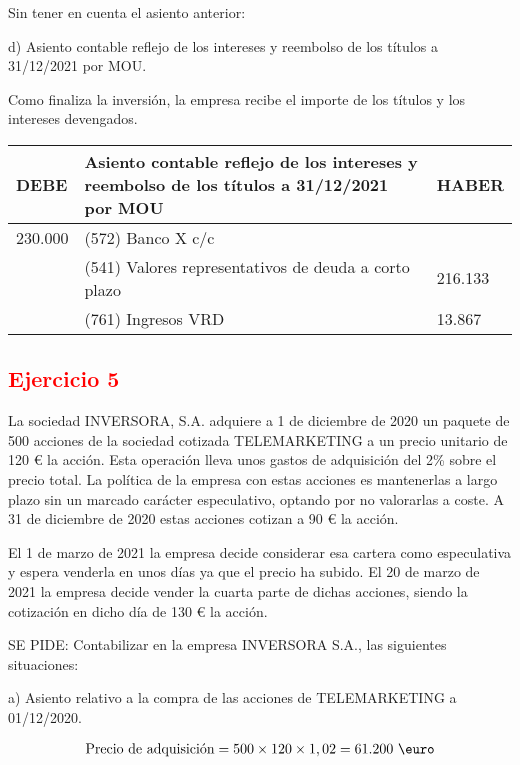 Sin tener en cuenta el asiento anterior:

d) Asiento contable reflejo de los intereses y reembolso de los títulos a 31/12/2021 por MOU.

Como finaliza la inversión, la empresa recibe el importe de los títulos y los intereses devengados.

\begin{table}[H]
    \centering
    \begin{tabular}{|p{3cm}|p{6cm}|p{3cm}|}
    \hline
    \rowcolor{blue!30}
    \textbf{DEBE} & \textbf{Asiento contable reflejo de los intereses y reembolso de los títulos a 31/12/2021 por MOU} & \textbf{HABER} \\
    \hline
    230.000 & (572) Banco X c/c & \\
    \hline
    & (541) Valores representativos de deuda a corto plazo & 216.133 \\
    \hline
    & (761) Ingresos VRD & 13.867 \\
    \hline
    \end{tabular}
\end{table}

\newpage
\subsection*{\textcolor{red}{\textbf{Ejercicio 5}}}

La sociedad INVERSORA, S.A. adquiere a 1 de diciembre de 2020 un paquete de 500 acciones de la sociedad cotizada TELEMARKETING a un precio unitario de 120 € la acción. Esta operación lleva unos gastos de adquisición del 2\% sobre el precio total. La política de la empresa con estas acciones es mantenerlas a largo plazo sin un marcado carácter especulativo, optando por no valorarlas a coste. A 31 de diciembre de 2020 estas acciones cotizan a 90 € la acción.

El 1 de marzo de 2021 la empresa decide considerar esa cartera como especulativa y espera venderla en unos días ya que el precio ha subido. El 20 de marzo de 2021 la empresa decide vender la cuarta parte de dichas acciones, siendo la cotización en dicho día de 130 € la acción.

SE PIDE: Contabilizar en la empresa INVERSORA S.A., las siguientes situaciones:

a) Asiento relativo a la compra de las acciones de TELEMARKETING a 01/12/2020.

\begin{align*}
    \text{Precio de adquisición} = 500 \times 120 \times 1,02 = 61.200 \text{ \euro}
\end{align*}

